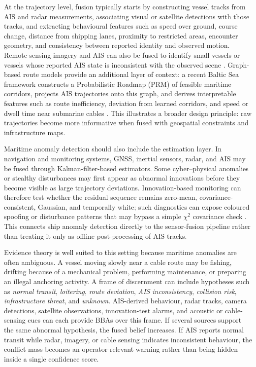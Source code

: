 \documentclass[11pt,oneside,openany]{book}
\begin{document}
At the trajectory level, fusion typically starts by constructing vessel tracks from AIS and radar measurements, associating visual or satellite detections with those tracks, and extracting behavioural features such as speed over ground, course change, distance from shipping lanes, proximity to restricted areas, encounter geometry, and consistency between reported identity and observed motion. Remote-sensing imagery and AIS can also be fused to identify small vessels or vessels whose reported AIS state is inconsistent with the observed scene \cite{chen_sviadf_2025}. Graph-based route models provide an additional layer of context: a recent Baltic Sea framework constructs a Probabilistic Roadmap (PRM) of feasible maritime corridors, projects AIS trajectories onto this graph, and derives interpretable features such as route inefficiency, deviation from learned corridors, and speed or dwell time near submarine cables \cite{oliva_tomei_prm_access_2026}. This illustrates a broader design principle: raw trajectories become more informative when fused with geospatial constraints and infrastructure maps.

Maritime anomaly detection should also include the estimation layer. In navigation and monitoring systems, GNSS, inertial sensors, radar, and AIS may be fused through Kalman-filter-based estimators. Some cyber--physical anomalies or stealthy disturbances may first appear as abnormal innovations before they become visible as large trajectory deviations. Innovation-based monitoring can therefore test whether the residual sequence remains zero-mean, covariance-consistent, Gaussian, and temporally white; such diagnostics can expose coloured spoofing or disturbance patterns that may bypass a simple \(\chi^2\) covariance check \cite{oliva_innovation_2026}. This connects ship anomaly detection directly to the sensor-fusion pipeline rather than treating it only as offline post-processing of AIS tracks.

Evidence theory is well suited to this setting because maritime anomalies are often ambiguous. A vessel moving slowly near a cable route may be fishing, drifting because of a mechanical problem, performing maintenance, or preparing an illegal anchoring activity. A frame of discernment can include hypotheses such as \emph{normal transit}, \emph{loitering}, \emph{route deviation}, \emph{AIS inconsistency}, \emph{collision risk}, \emph{infrastructure threat}, and \emph{unknown}. AIS-derived behaviour, radar tracks, camera detections, satellite observations, innovation-test alarms, and acoustic or cable-sensing cues can each provide BBAs over this frame. If several sources support the same abnormal hypothesis, the fused belief increases. If AIS reports normal transit while radar, imagery, or cable sensing indicates inconsistent behaviour, the conflict mass becomes an operator-relevant warning rather than being hidden inside a single confidence score.
\end{document}
